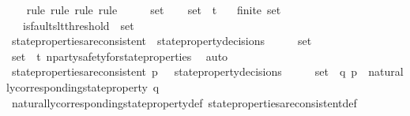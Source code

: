 \begin{isabellebody}
%
\isadelimproof
\ \ %
\endisadelimproof
%
\isatagproof
{}\isamarkupfalse%
\ {\isacharparenleft}rule{\isacharcomma}\ rule{\isacharcomma}\ rule{\isacharcomma}\ rule{\isacharparenright}\isanewline
{}\isamarkupfalse%
\ {\isacharminus}\isanewline
\ \ \isamarkupfalse%
\ {\isasymsigma}{\isacharunderscore}set\isanewline
\ \ \isamarkupfalse%
\ {\isachardoublequoteopen}{\isasymsigma}{\isacharunderscore}set\ {\isasymsubseteq}\ {\isasymSigma}t{\isachardoublequoteclose}\isanewline
\ \ \ {\isachardoublequoteopen}finite\ {\isasymsigma}{\isacharunderscore}set{\isachardoublequoteclose}\isanewline
\ \ \ {\isachardoublequoteopen}is{\isacharunderscore}faults{\isacharunderscore}lt{\isacharunderscore}threshold\ {\isacharparenleft}{\isasymUnion}\ {\isasymsigma}{\isacharunderscore}set{\isacharparenright}{\isachardoublequoteclose}\isanewline
\ \ \isamarkupfalse%
\ {\isachardoublequoteopen}state{\isacharunderscore}properties{\isacharunderscore}are{\isacharunderscore}consistent\ {\isacharparenleft}{\isasymUnion}\ {\isacharbraceleft}state{\isacharunderscore}property{\isacharunderscore}decisions\ {\isasymsigma}\ {\isacharbar}\ {\isasymsigma}{\isachardot}\ {\isasymsigma}\ {\isasymin}\ {\isasymsigma}{\isacharunderscore}set{\isacharbraceright}{\isacharparenright}{\isachardoublequoteclose}\isanewline
\ \ \ \ \isamarkupfalse%
\ {\isacartoucheopen}{\isasymsigma}{\isacharunderscore}set\ {\isasymsubseteq}\ {\isasymSigma}t{\isacartoucheclose}\ n{\isacharunderscore}party{\isacharunderscore}safety{\isacharunderscore}for{\isacharunderscore}state{\isacharunderscore}properties\ \isamarkupfalse%
\ auto\isanewline
\ \ \isamarkupfalse%
\ {\isachardoublequoteopen}state{\isacharunderscore}properties{\isacharunderscore}are{\isacharunderscore}consistent\ {\isacharbraceleft}p\ {\isasymin}\ {\isasymUnion}\ {\isacharbraceleft}state{\isacharunderscore}property{\isacharunderscore}decisions\ {\isasymsigma}\ {\isacharbar}\ {\isasymsigma}{\isachardot}\ {\isasymsigma}\ {\isasymin}\ {\isasymsigma}{\isacharunderscore}set{\isacharbraceright}{\isachardot}\ {\isasymexists}\ q{\isachardot}\ p\ {\isacharequal}\ naturally{\isacharunderscore}corresponding{\isacharunderscore}state{\isacharunderscore}property\ q{\isacharbraceright}{\isachardoublequoteclose}\isanewline
\ \ \ \ \isamarkupfalse%
\ naturally{\isacharunderscore}corresponding{\isacharunderscore}state{\isacharunderscore}property{\isacharunderscore}def\ state{\isacharunderscore}properties{\isacharunderscore}are{\isacharunderscore}consistent{\isacharunderscore}def\isanewline

\end{isabellebody}
